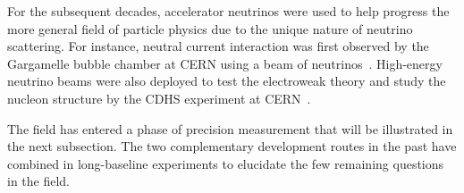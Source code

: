 For the subsequent decades, accelerator neutrinos were used to help progress the more general field of particle physics due to the unique nature of neutrino scattering.
For instance, neutral current interaction was first observed by the Gargamelle bubble chamber at CERN using a beam of neutrinos~\cite{GargamelleNeutrino:1973jyy}.
High-energy neutrino beams were also deployed to test the electroweak theory and study the nucleon structure by the CDHS experiment at CERN~\cite{Schlatter:2015nxk}.

The field has entered a phase of precision measurement that will be illustrated in the next subsection.
The two complementary development routes in the past have combined in long-baseline experiments to elucidate the few remaining questions in the field.






